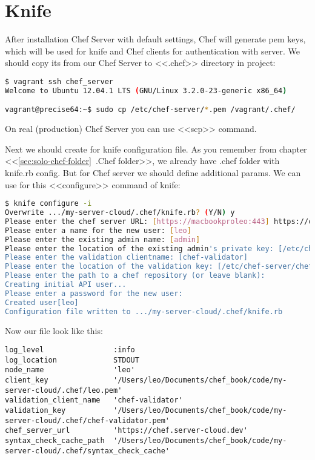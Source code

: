 \section{Knife}

After installation Chef Server with default settings, Chef will generate pem keys, which will be used for knife and Chef clients for authentication with server. We should copy its from our Chef Server to <<.chef>> directory in project:

\begin{lstlisting}[language=Bash,label=lst:my-server-cloud-knife1]
$ vagrant ssh chef_server
Welcome to Ubuntu 12.04.1 LTS (GNU/Linux 3.2.0-23-generic x86_64)

vagrant@precise64:~$ sudo cp /etc/chef-server/*.pem /vagrant/.chef/
\end{lstlisting}

On real (production) Chef Server you can use <<scp>> command.

Next we should create for knife configuration file. As you remember from chapter <<\ref{sec:solo-chef-folder}~.Chef folder>>, we already have .chef folder with knife.rb config. But for Chef server we should define additional params. We can use for this <<configure>> command of knife:

\begin{lstlisting}[language=Bash,label=lst:my-server-cloud-knife2]
$ knife configure -i
Overwrite .../my-server-cloud/.chef/knife.rb? (Y/N) y
Please enter the chef server URL: [https://macbookproleo:443] https://chef.server-cloud.dev
Please enter a name for the new user: [leo]
Please enter the existing admin name: [admin]
Please enter the location of the existing admin's private key: [/etc/chef-server/admin.pem] .chef/admin.pem
Please enter the validation clientname: [chef-validator]
Please enter the location of the validation key: [/etc/chef-server/chef-validator.pem] .chef/chef-validator.pem
Please enter the path to a chef repository (or leave blank):
Creating initial API user...
Please enter a password for the new user:
Created user[leo]
Configuration file written to .../my-server-cloud/.chef/knife.rb
\end{lstlisting}

Now our file look like this:

\begin{lstlisting}[label=lst:my-server-cloud-knife3,title=my-server-cloud/.chef/knife.rb]
log_level                :info
log_location             STDOUT
node_name                'leo'
client_key               '/Users/leo/Documents/chef_book/code/my-server-cloud/.chef/leo.pem'
validation_client_name   'chef-validator'
validation_key           '/Users/leo/Documents/chef_book/code/my-server-cloud/.chef/chef-validator.pem'
chef_server_url          'https://chef.server-cloud.dev'
syntax_check_cache_path  '/Users/leo/Documents/chef_book/code/my-server-cloud/.chef/syntax_check_cache'
\end{lstlisting}

